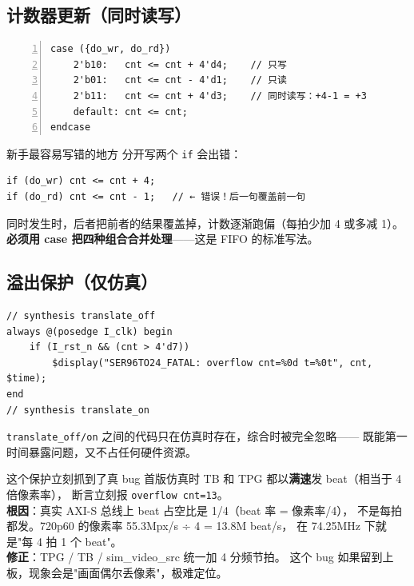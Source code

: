 \subsection{计数器更新（同时读写）}

\begin{Verbatim}[frame=single,fontsize=\small,numbers=left]
case ({do_wr, do_rd})
    2'b10:   cnt <= cnt + 4'd4;    // 只写
    2'b01:   cnt <= cnt - 4'd1;    // 只读
    2'b11:   cnt <= cnt + 4'd3;    // 同时读写：+4-1 = +3
    default: cnt <= cnt;
endcase
\end{Verbatim}

\begin{warnbox}{新手最容易写错的地方}
分开写两个 \texttt{if} 会出错：
\begin{Verbatim}[fontsize=\small]
if (do_wr) cnt <= cnt + 4;
if (do_rd) cnt <= cnt - 1;   // ← 错误！后一句覆盖前一句
\end{Verbatim}
同时发生时，后者把前者的结果覆盖掉，计数逐渐跑偏（每拍少加 4 或多减 1）。
\textbf{必须用 case 把四种组合合并处理}——这是 FIFO 的标准写法。
\end{warnbox}

\subsection{溢出保护（仅仿真）}

\begin{Verbatim}[frame=single,fontsize=\small]
// synthesis translate_off
always @(posedge I_clk) begin
    if (I_rst_n && (cnt > 4'd7))
        $display("SER96TO24_FATAL: overflow cnt=%0d t=%0t", cnt, $time);
end
// synthesis translate_on
\end{Verbatim}

\texttt{translate\_off/on} 之间的代码只在仿真时存在，综合时被完全忽略——
既能第一时间暴露问题，又不占任何硬件资源。

\begin{warnbox}{这个保护立刻抓到了真 bug}
首版仿真时 TB 和 TPG 都以\textbf{满速}发 beat（相当于 4 倍像素率），
断言立刻报 \texttt{overflow cnt=13}。\\[4pt]
\textbf{根因}：真实 AXI-S 总线上 beat 占空比是 1/4（beat 率 = 像素率/4），
不是每拍都发。720p60 的像素率 55.3Mpx/s ÷ 4 = 13.8M beat/s，
在 74.25MHz 下就是"每 4 拍 1 个 beat"。\\[4pt]
\textbf{修正}：TPG / TB / sim\_video\_src 统一加 4 分频节拍。
这个 bug 如果留到上板，现象会是"画面偶尔丢像素"，极难定位。
\end{warnbox}

